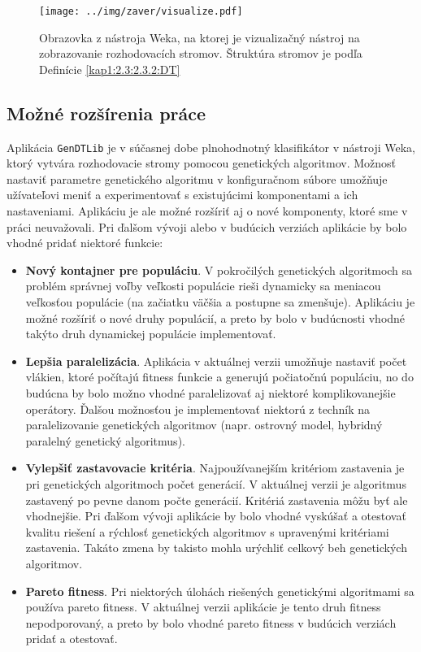 \begin{figure}[h]
\centering
\centerline{\mbox{\texttt{[image: ../img/zaver/visualize.pdf]}}}
\caption{Obrazovka z nástroja Weka, na ktorej je vizualizačný nástroj na zobrazovanie rozhodovacích stromov. Štruktúra stromov je podľa Definície \ref{kap1:2.3:2.3.2:DT}}\label{fig:wekatree}
\end{figure}

\subsection{Možné rozšírenia práce}
Aplikácia \verb|GenDTLib| je v súčasnej dobe plnohodnotný klasifikátor v nástroji Weka, ktorý vytvára rozhodovacie stromy pomocou genetických algoritmov. Možnosť nastaviť parametre genetického algoritmu v konfiguračnom súbore umožňuje užívateľovi meniť a experimentovať s existujúcimi komponentami a ich nastaveniami. Aplikáciu je ale možné rozšíriť aj o nové komponenty, ktoré sme v práci neuvažovali. Pri ďalšom vývoji alebo v budúcich verziách aplikácie by bolo vhodné pridať niektoré funkcie:

\begin{itemize}
\item \textbf{Nový kontajner pre populáciu}. V pokročilých genetických algoritmoch sa problém správnej voľby veľkosti populácie rieši dynamicky sa meniacou veľkosťou populácie (na začiatku väčšia a postupne sa zmenšuje). Aplikáciu je možné rozšíriť o nové druhy populácií, a preto by bolo v budúcnosti vhodné takýto druh dynamickej populácie implementovať.
\item \textbf{Lepšia paralelizácia}. Aplikácia v aktuálnej verzii umožňuje nastaviť počet vlákien, ktoré počítajú fitness funkcie a generujú počiatočnú populáciu, no do budúcna by bolo možno vhodné paralelizovať aj niektoré komplikovanejšie operátory. Ďalšou možnosťou je implementovať niektorú z techník na paralelizovanie genetických algoritmov (napr. ostrovný model, hybridný paralelný genetický algoritmus).
\item \textbf{Vylepšiť zastavovacie kritéria}. Najpoužívanejším kritériom zastavenia je pri genetických algoritmoch počet generácií. V aktuálnej verzii je algoritmus zastavený po pevne danom počte generácií. Kritériá zastavenia môžu byť ale vhodnejšie. Pri ďalšom vývoji aplikácie by bolo vhodné vyskúšať a otestovať kvalitu riešení a rýchlosť genetických algoritmov s upravenými kritériami zastavenia. Takáto zmena by takisto mohla urýchliť celkový beh genetických algoritmov.
\item \textbf{Pareto fitness}. Pri niektorých úlohách riešených genetickými algoritmami sa používa pareto fitness. V aktuálnej verzii aplikácie je tento druh fitness nepodporovaný, a preto by bolo vhodné pareto fitness v budúcich verziách pridať a otestovať.
\end{itemize}